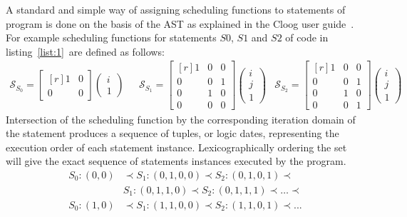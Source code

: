 A standard and simple way of assigning scheduling functions to statements of
program is done on the basis of the AST as explained in the Cloog user
guide~\cite{cloog}.
For example scheduling functions
for statements $S0$, $S1$ and $S2$ of code in listing~\ref{list:1}~are defined
as follows:
\begin{align*}
\mathcal{S}_{S_{0}} = \begin{bmatrix*}[r] 1 & 0 \\ 0 & 0 \end{bmatrix*} 
					\begin{pmatrix} i \\ 1 \end{pmatrix} ~~~ &
\mathcal{S}_{S_{1}} = \begin{bmatrix*}[r] 1 & 0 & 0 \\ 0 & 0 & 1 \\ 
										0 & 1 & 0 \\ 0 & 0 & 0
					\end{bmatrix*} 
					\begin{pmatrix} i \\ j \\ 1 \end{pmatrix} &
\mathcal{S}_{S_{2}} = \begin{bmatrix*}[r] 1 & 0 & 0 \\ 0 & 0 & 1 \\ 
										0 & 1 & 0 \\  0 & 0 & 1 
					\end{bmatrix*} 
					\begin{pmatrix} i \\ j \\ 1 \end{pmatrix}
\end{align*}
Intersection of the scheduling function by the corresponding iteration domain of
the statement produces a sequence of tuples, or logic dates, representing
the execution order of each statement instance. Lexicographically 
ordering the set will give the exact sequence of statements instances executed
by the program. %
\begin{align*}
	S_0:(0,0) & \prec S_1:(0,1,0,0) \prec S_2:(0,1,0,1) \prec \\ 
			  & S_1:(0,1,1,0) \prec S_2:(0,1,1,1) \prec \ldots \prec \\
	S_0:(1,0) & \prec S_1:(1,1,0,0) \prec S_2:(1,1,0,1) \prec ...
\end{align*}


